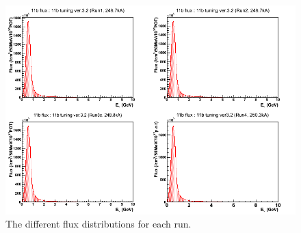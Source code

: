\begin{figure}[h]
\centering
\includegraphics[width=5in]{Figures/fluxes.png}
\caption{The different flux distributions for each run.}
\label{fig:fluxes}
\end{figure}

